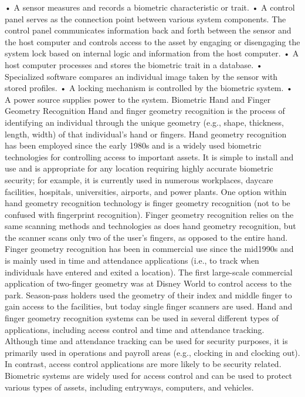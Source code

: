 \documentclass{article}
\begin{document}
• A sensor measures and records a biometric characteristic or trait. • A
control panel serves as the connection point between various system
components. The control panel communicates information back and forth
between the sensor and the host computer and controls access to the
asset by engaging or disengaging the system lock based on internal logic
and information from the host computer. • A host computer processes and
stores the biometric trait in a database. • Specialized software
compares an individual image taken by the sensor with stored profiles. •
A locking mechanism is controlled by the biometric system. • A power
source supplies power to the system. Biometric Hand and Finger Geometry
Recognition Hand and finger geometry recognition is the process of
identifying an individual through the unique geometry (e.g., shape,
thickness, length, width) of that individual's hand or fingers. Hand
geometry recognition has been employed since the early 1980s and is a
widely used biometric technologies for controlling access to important
assets. It is simple to install and use and is appropriate for any
location requiring highly accurate biometric security; for example, it
is currently used in numerous workplaces, daycare facilities, hospitals,
universities, airports, and power plants. One option within hand
geometry recognition technology is finger geometry recognition (not to
be confused with fingerprint recognition). Finger geometry recognition
relies on the same scanning methods and technologies as does hand
geometry recognition, but the scanner scans only two of the user's
fingers, as opposed to the entire hand. Finger geometry recognition has
been in commercial use since the mid1990s and is mainly used in time and
attendance applications (i.e., to track when individuals have entered
and exited a location). The first large-scale commercial application of
two-finger geometry was at Disney World to control access to the park.
Season-pass holders used the geometry of their index and middle finger
to gain access to the facilities, but today single finger scanners are
used. Hand and finger geometry recognition systems can be used in
several different types of applications, including access control and
time and attendance tracking. Although time and attendance tracking can
be used for security purposes, it is primarily used in operations and
payroll areas (e.g., clocking in and clocking out). In contrast, access
control applications are more likely to be security related. Biometric
systems are widely used for access control and can be used to protect
various types of assets, including entryways, computers, and vehicles.
\end{document}
